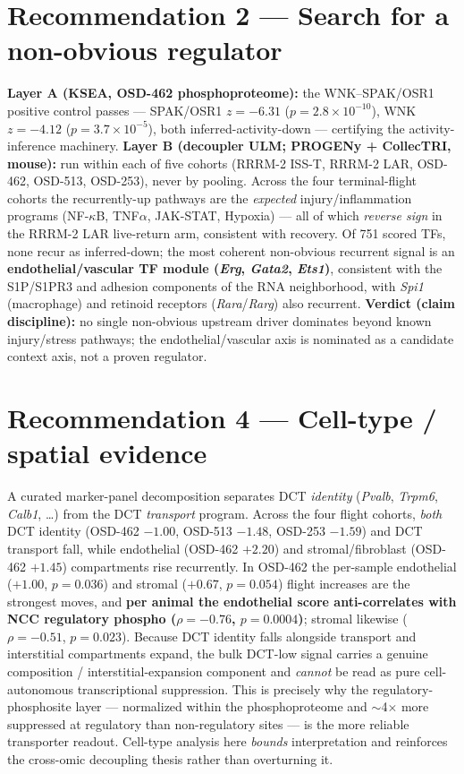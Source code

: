 \documentclass[10pt]{article}
\newcommand{\grsup}{\textcolor{good}{\textbf{supported}}}
\newcommand{\nom}{\textcolor{neut}{\textbf{nomination}}}
\newcommand{\gene}[1]{\textit{#1}}
\begin{document}
\section*{Recommendation 2 --- Search for a non-obvious regulator \quad[KSEA anchor \grsup; Layer B \nom]}
\textbf{Layer A (KSEA, OSD-462 phosphoproteome):} the WNK--SPAK/OSR1 positive
control passes --- SPAK/OSR1 $z=-6.31$ ($p=2.8\times10^{-10}$), WNK $z=-4.12$
($p=3.7\times10^{-5}$), both inferred-activity-down --- certifying the
activity-inference machinery. \textbf{Layer B (decoupler ULM; PROGENy + CollecTRI,
mouse):} run within each of five cohorts (RRRM-2 ISS-T, RRRM-2 LAR, OSD-462,
OSD-513, OSD-253), never by pooling. Across the four terminal-flight cohorts the
recurrently-up pathways are the \emph{expected} injury/inflammation programs
(NF-$\kappa$B, TNF$\alpha$, JAK-STAT, Hypoxia) --- all of which \emph{reverse sign}
in the RRRM-2 LAR live-return arm, consistent with recovery. Of 751 scored TFs,
none recur as inferred-down; the most coherent non-obvious recurrent signal is an
\textbf{endothelial/vascular TF module (\gene{Erg}, \gene{Gata2}, \gene{Ets1})},
consistent with the S1P/S1PR3 and adhesion components of the RNA neighborhood, with
\gene{Spi1} (macrophage) and retinoid receptors (\gene{Rara}/\gene{Rarg}) also
recurrent. \textbf{Verdict (claim discipline):} no single non-obvious upstream
driver dominates beyond known injury/stress pathways; the endothelial/vascular axis
is nominated as a candidate context axis, not a proven regulator.

\section*{Recommendation 4 --- Cell-type / spatial evidence }
A curated marker-panel decomposition separates DCT \emph{identity} (\gene{Pvalb},
\gene{Trpm6}, \gene{Calb1}, \ldots) from the DCT \emph{transport} program. Across
the four flight cohorts, \emph{both} DCT identity (OSD-462 $-1.00$, OSD-513 $-1.48$,
OSD-253 $-1.59$) and DCT transport fall, while endothelial (OSD-462 $+2.20$) and
stromal/fibroblast (OSD-462 $+1.45$) compartments rise recurrently. In OSD-462 the
per-sample endothelial ($+1.00$, $p=0.036$) and stromal ($+0.67$, $p=0.054$) flight
increases are the strongest moves, and \textbf{per animal the endothelial score
anti-correlates with NCC regulatory phospho ($\rho=-0.76$, $p=0.0004$)}; stromal
likewise ($\rho=-0.51$, $p=0.023$). Because DCT identity falls alongside transport
and interstitial compartments expand, the bulk DCT-low signal carries a genuine
composition / interstitial-expansion component and \emph{cannot} be read as pure
cell-autonomous transcriptional suppression. This is precisely why the
regulatory-phosphosite layer --- normalized within the phosphoproteome and
$\sim$4$\times$ more suppressed at regulatory than non-regulatory sites --- is the
more reliable transporter readout. Cell-type analysis here \emph{bounds}
interpretation and reinforces the cross-omic decoupling thesis rather than
overturning it.
\end{document}
